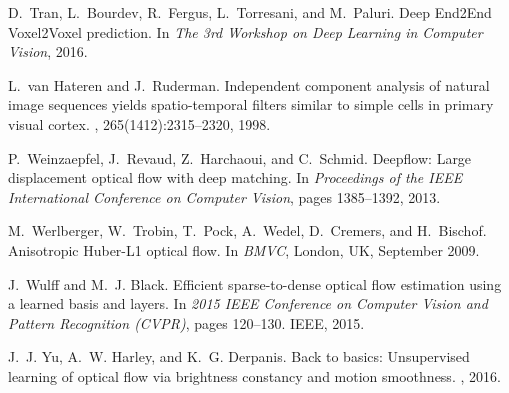 \documentclass[10pt,twocolumn,letterpaper]{article}
\begin{document}
\begin{thebibliography}{10}
D.~Tran, L.~Bourdev, R.~Fergus, L.~Torresani, and M.~Paluri.
\newblock Deep {End2End} {Voxel2Voxel} prediction.
\newblock In {\em The 3rd Workshop on Deep Learning in Computer Vision}, 2016.

L.~van Hateren and J.~Ruderman.
\newblock Independent component analysis of natural image sequences yields
  spatio-temporal filters similar to simple cells in primary visual cortex.
, 265(1412):2315–2320, 1998.

P.~Weinzaepfel, J.~Revaud, Z.~Harchaoui, and C.~Schmid.
\newblock Deepflow: Large displacement optical flow with deep matching.
\newblock In {\em Proceedings of the IEEE International Conference on Computer
  Vision}, pages 1385--1392, 2013.

M.~Werlberger, W.~Trobin, T.~Pock, A.~Wedel, D.~Cremers, and H.~Bischof.
\newblock Anisotropic {Huber-L1} optical flow.
\newblock In {\em BMVC}, London, UK, September 2009.

J.~Wulff and M.~J. Black.
\newblock Efficient sparse-to-dense optical flow estimation using a learned
  basis and layers.
\newblock In {\em 2015 IEEE Conference on Computer Vision and Pattern
  Recognition (CVPR)}, pages 120--130. IEEE, 2015.

J.~J. Yu, A.~W. Harley, and K.~G. Derpanis.
\newblock Back to basics: Unsupervised learning of optical flow via brightness
  constancy and motion smoothness.
, 2016.

\end{thebibliography}
\end{document}
